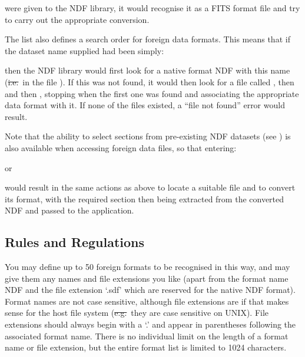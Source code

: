 \begin{quote}
\end{quote}

were given to the NDF library, it would recognise it as a FITS format
file and try to carry out the appropriate conversion.

The list also defines a search order for foreign data formats. This
means that if the dataset name supplied had been simply:

\begin{quote}
\end{quote}

then the NDF library would first look for a native format NDF with
this name (\st{i.e.}\ in the file ). If this was not
found, it would then look for a file called , then
 and then , stopping when the first
one was found and associating the appropriate data format with it. If
none of the files existed, a ``file not found'' error would result.

Note that the ability to select sections from pre-existing NDF
datasets (see
) is also
available when accessing foreign data files, so that entering:

\begin{quote}
\end{quote}

or

\begin{quote}
\end{quote}

would result in the same actions as above to locate a suitable file
and to convert its format, with the required section then being
extracted from the converted NDF and passed to the application.

\subsection{\label{sect:rules}Rules and Regulations}

You may define up to 50 foreign formats to be recognised in this way,
and may give them any names and file extensions you like (apart from
the format name NDF and the file extension `.sdf' which are reserved
for the native NDF format). Format names are not case sensitive,
although file extensions are if that makes sense for the host file
system (\st{e.g.}\ they are case sensitive on UNIX).  File extensions
should always begin with a `.' and appear in parentheses following the
associated format name.  There is no individual limit on the length of
a format name or file extension, but the entire format list is limited
to 1024 characters.

